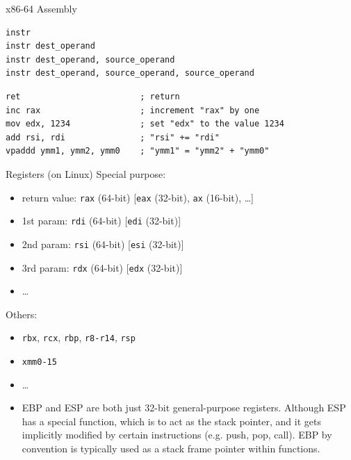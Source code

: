 \documentclass[compress,aspectratio=1610]{beamer}
\begin{document}
\begin{frame}[fragile]{x86-64 Assembly}
    \begin{lstlisting}[language={}]
instr
instr dest_operand
instr dest_operand, source_operand
instr dest_operand, source_operand, source_operand
    \end{lstlisting}

    \begin{lstlisting}[language={}]
ret                        ; return
inc rax                    ; increment "rax" by one
mov edx, 1234              ; set "edx" to the value 1234
add rsi, rdi               ; "rsi" += "rdi"
vpaddd ymm1, ymm2, ymm0    ; "ymm1" = "ymm2" + "ymm0"
    \end{lstlisting}
\end{frame}

\begin{frame}{Registers (on Linux)}
    Special purpose:
    \begin{itemize}
        \item return value: \texttt{rax} (64-bit) [\texttt{eax} (32-bit), \texttt{ax} (16-bit), \ldots]
        \item 1st param: \texttt{rdi} (64-bit) [\texttt{edi} (32-bit)]
        \item 2nd param: \texttt{rsi} (64-bit) [\texttt{esi} (32-bit)]
        \item 3rd param: \texttt{rdx} (64-bit) [\texttt{edx} (32-bit)]
        \item \ldots
    \end{itemize}

    Others:
    \begin{itemize}
        \item \texttt{rbx}, \texttt{rcx}, \texttt{rbp}, \texttt{r8-r14}, \texttt{rsp}
        \item \texttt{xmm0-15}
        \item \ldots
    \end{itemize}
\end{frame}

\begin{frame}[plain]
    \begin{itemize}
        \item EBP and ESP are both just 32-bit general-purpose registers. Although ESP has a special function, which is to act as the stack pointer, and it gets implicitly modified by certain instructions (e.g. push, pop, call). EBP by convention is typically used as a stack frame pointer within functions.
    \end{itemize}
\end{frame}
\end{document}
